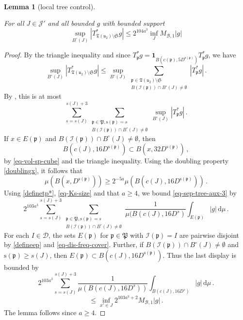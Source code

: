 \documentclass[10pt,a4paper]{article}
\theoremstyle{plain}
\newtheorem{lemma}[theorem]{Lemma}
\theoremstyle{definition}
\numberwithin{equation}{subsection}
\newcommand{\fp}{{\mathfrak p}}
\newcommand{\fP}{{\mathfrak P}}
\newcommand{\fu}{{\mathfrak u}}
\newcommand{\fT}{{\mathfrak T}}
\newcommand{\pc}{{\mathrm{c}}}
\newcommand{\ps}{{\mathrm{s}}}
\newcommand{\scI}{{\mathcal{I}}} %
\newcommand{\lean}[1]{}
\newcommand{\uses}[1]{}
\newcommand{\leanok}{}
\begin{document}
    \begin{lemma}[local tree control]
        \label{local-tree-control}
        \leanok
        \lean{TileStructure.Forest.local_tree_control}
        \uses{limited-scale-impact}
        For all $J \in \mathcal{J}'$ and all bounded $g$ with bounded support
        $$
            \sup_{B^\circ{}(J)} |T_{\mathfrak{T}(\mathfrak{u}_2)\setminus\mathfrak{S}}^* g| \le 2^{104a^3} \inf_J M_{\mathcal{B},1}|g|
        $$
    \end{lemma}

    \begin{proof}
        \leanok
        By the triangle inequality and since $T_{\fp}^* g = \mathbf{1}_{B(\pc(\fp), 5D^{\ps(\fp)})} T_{\fp}^* g$, we have
        $$
            \sup_{B^\circ{}(J)} |T_{\fT(\fu_2) \setminus\mathfrak{S}}^* g|
            \leq \sup_{B^\circ{}(J)} \sum_{\substack{\fp \in \fT(\fu_2) \setminus \mathfrak{S}\\ B(\scI(\fp)) \cap B^\circ(J) \ne \emptyset}} |T_{\fp}^*g|\,.
        $$
        By , this is at most
      \begin{equation}
            \label{eq-sep-tree-aux-3}
            \sum_{s = s(J)}^{s(J) + 3} \sum_{\substack{\fp \in \fP, \ps(\fp) = s\\ B(\scI(\fp)) \cap B^\circ(J) \ne \emptyset}} \sup_{B^\circ{}(J)} |T_{\fp}^* g|\,.
        \end{equation}
        If $x \in E(\fp)$ and $B(\scI(\fp)) \cap B^\circ(J) \ne \emptyset$, then
        $$
            B(c(J), 16D^{\ps(\fp)}) \subset B(x, 32 D^{\ps(\fp)})\,,
        $$
        by \eqref{eq-vol-sp-cube} and the triangle inequality. Using the doubling property \eqref{doublingx}, it follows that
        $$
            \mu(B(x, D^{\ps(\fp)})) \ge 2^{-5a} \mu(B(c(J), 16D^{\ps(\fp)}))\,.
        $$
        Using \eqref{definetp*}, \eqref{eq-Ks-size} and that $a \ge 4$, we bound \eqref{eq-sep-tree-aux-3} by
        $$
            2^{103a^3}\sum_{s = s(J)}^{s(J) + 3} \sum_{\substack{\fp \in \fP, \ps(\fp) = s\\B(\scI(\fp)) \cap B^\circ(J) \ne \emptyset}} \frac{1}{\mu(B(c(J), 16 D^s)} \int_{E(\fp)} |g| \, \mathrm{d}\mu\,.
        $$
        For each $I \in \mathcal{D}$, the sets $E(\fp)$ for $\fp \in \fP$ with $\scI(\fp) = I$ are pairwise disjoint by \eqref{defineep} and \eqref{eq-dis-freq-cover}.
        Further, if $B(\scI(\fp)) \cap B^\circ(J) \ne \emptyset$ and $\ps(\fp) \ge s(J)$, then $E(\fp) \subset B(c(J), 16 D^{\ps(\fp)})$. Thus the last display is bounded by
        $$
            2^{103a^3}\sum_{s = s(J)}^{s(J) + 3} \frac{1}{\mu(B(c(J), 16 D^s))} \int_{B(c(J), 16 D^s)} |g| \, \mathrm{d}\mu\,.
        $$
        $$
            \le \inf_{x' \in J} 2^{103a^3 +2} M_{\mathcal{B}, 1} |g|\,.
        $$
        The lemma follows since $a \ge 4$.
    \end{proof}
\end{document}
